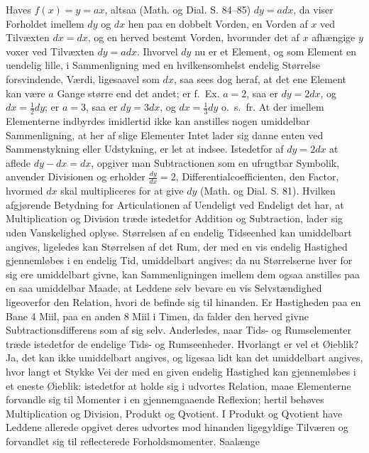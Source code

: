 \documentclass[12pt,a4paper]{book}
\begin{document}
Haves $f(x) = y = ax$, altsaa (Math. og Dial. S. 84--85) $dy = adx$,
da viser Forholdet imellem $dy$ og $dx$ hen paa en dobbelt Vorden, en
Vorden af $x$ ved Tilvæxten $dx = dx$, og en herved bestemt Vorden,
hvorunder det af $x$ afhængige $y$ voxer ved Tilvæxten $dy = adx$.
Ihvorvel $dy$ nu er et Element, og som Element en uendelig lille, i
Sammenligning med en hvilkensomhelst endelig Størrelse forsvindende,
Værdi, ligesaavel som $dx$, saa sees dog heraf, at det ene Element kan
være $a$ Gange større end det andet; er f.~Ex. $a = 2$, saa er $dy =
2dx$, og $dx = \frac{1}{2}dy$; er $a = 3$, saa er $dy = 3dx$, og $dx =
\frac{1}{3}dy$ o.~s.~fr. At der imellem Elementerne indbyrdes
imidlertid ikke kan anstilles nogen umiddelbar Sammenligning, at her af
slige Elementer Intet lader sig danne enten ved Sammenstykning eller
Udstykning, er let at indsee. Istedetfor af $dy = 2dx$ at aflede $dy -
dx = dx$, opgiver man Subtractionen som en ufrugtbar Symbolik,
anvender Divisionen og erholder $\frac{dy}{dx} = 2$,
Differentialcoefficienten, den Factor, hvormed $dx$ skal multipliceres
for at give $dy$ (Math. og Dial. S. 81). Hvilken afgjørende Betydning
for Articulationen af Uendeligt ved Endeligt det har, at Multiplication
og Division træde istedetfor Addition og Subtraction, lader sig uden
Vanskelighed oplyse. Størrelsen af en endelig Tidseenhed kan
umiddelbart angives, ligeledes kan Størrelsen af det Rum, der med en
vis endelig Hastighed gjennemløbes i en endelig Tid, umiddelbart
angives; da nu Størrelserne hver for sig ere umiddelbart givne, kan
Sammenligningen imellem dem ogsaa anstilles paa en saa umiddelbar
Maade, at Leddene selv bevare en vis Selvstændighed ligeoverfor den
Relation, hvori de befinde sig til hinanden. Er Hastigheden paa en
Bane 4 Miil, paa en anden 8 Miil i Timen, da falder den herved givne
Subtractionsdifferens som af sig selv. Anderledes, naar Tids- og
Rumselementer træde istedetfor de endelige Tids- og Rumseenheder.
\setcounter{footnote}{0}
Hvorlangt er vel et Øieblik? Ja, det kan ikke umiddelbart angives, og
ligesaa lidt kan det umiddelbart angives, hvor langt et Stykke Vei der
med en given endelig Hastighed kan gjennemløbes i et eneste Øieblik:
istedetfor at holde sig i udvortes Relation, maae Elementerne forvandle
sig til Momenter i en gjennemgaaende Reflexion; hertil behøves
Multiplication og Division, Produkt og Qvotient. I Produkt og Qvotient
have Leddene allerede opgivet deres udvortes mod hinanden ligegyldige
Tilværen og forvandlet sig til reflecterede Forholdsmomenter. Saalænge
\end{document}
